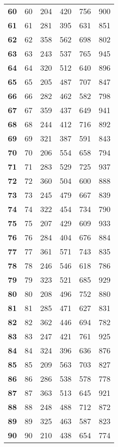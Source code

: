 \begin{longtable}{|l|c|c|c|c|c|}
  \textbf{60} & 60 &204 & 420 & 756 & 900 \\
  \textbf{61} & 61 &281 & 395 & 631 & 851 \\
  \textbf{62} & 62 &358 & 562 & 698 & 802 \\
  \textbf{63} & 63 &243 & 537 & 765 & 945 \\
  \textbf{64} & 64 &320 & 512 & 640 & 896 \\
  \textbf{65} & 65 &205 & 487 & 707 & 847 \\
  \textbf{66} & 66 &282 & 462 & 582 & 798 \\
  \textbf{67} & 67 &359 & 437 & 649 & 941 \\
  \textbf{68} & 68 &244 & 412 & 716 & 892 \\
  \textbf{69} & 69 &321 & 387 & 591 & 843 \\
  \textbf{70} & 70 &206 & 554 & 658 & 794 \\
  \textbf{71} & 71 &283 & 529 & 725 & 937 \\
  \textbf{72} & 72 &360 & 504 & 600 & 888 \\
  \textbf{73} & 73 &245 & 479 & 667 & 839 \\
  \textbf{74} & 74 &322 & 454 & 734 & 790 \\
  \textbf{75} & 75 &207 & 429 & 609 & 933 \\
  \textbf{76} & 76 &284 & 404 & 676 & 884 \\
  \textbf{77} & 77 &361 & 571 & 743 & 835 \\
  \textbf{78} & 78 &246 & 546 & 618 & 786 \\
  \textbf{79} & 79 &323 & 521 & 685 & 929 \\
  \textbf{80} & 80 &208 & 496 & 752 & 880 \\
  \textbf{81} & 81 &285 & 471 & 627 & 831 \\
  \textbf{82} & 82 &362 & 446 & 694 & 782 \\
  \textbf{83} & 83 &247 & 421 & 761 & 925 \\
  \textbf{84} & 84 &324 & 396 & 636 & 876 \\
  \textbf{85} & 85 &209 & 563 & 703 & 827 \\
  \textbf{86} & 86 &286 & 538 & 578 & 778 \\
  \textbf{87} & 87 &363 & 513 & 645 & 921 \\
  \textbf{88} & 88 &248 & 488 & 712 & 872 \\
  \textbf{89} & 89 &325 & 463 & 587 & 823 \\
  \textbf{90} & 90 &210 & 438 & 654 & 774 \\

\end{longtable}

